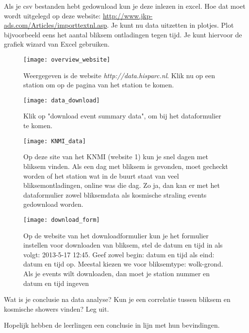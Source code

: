 \begin{questions}
\question 
Als je csv bestanden hebt gedownload kun je deze inlezen in excel. Hoe dat moet 
wordt uitgelegd op deze website: \url{ http://www.jkp-ads.com/Articles/importtextnl.asp}.
Je kunt nu data uitzetten in plotjes.
Plot bijvoorbeeld eens het aantal bliksem ontladingen tegen tijd.
Je kunt hiervoor de grafiek wizard van Excel gebruiken.


\begin{figure}
    \centering
    \texttt{[image: overview\_website]}
    \caption{Weergegeven is de website \textit{http://data.hisparc.nl}. 
    Klik nu op een station om op de pagina van 
    het station te komen.}
    \label{fig:overview_website}
\end{figure}

\begin{figure}
    \centering
    \texttt{[image: data\_download]}
    \caption{Klik op "download event summary data", om bij het dataformulier te komen.}
    \label{fig:data_download}
\end{figure}

\begin{figure}
    \centering
    \texttt{[image: KNMI\_data]}
    \caption{Op deze site van het KNMI (website 1) kun je snel dagen met bliksem vinden. Als een dag 
    met bliksem is gevonden, moet gecheckt worden of het \hisparc station wat in de
    buurt staat van veel bliksemontladingen, online was die dag. Zo ja, dan kan 
    er met het dataformulier zowel bliksemdata als kosmische straling events
    gedownload worden.}
    \label{fig:KNMI_data}
\end{figure}

\begin{figure}
    \centering
    \texttt{[image: download\_form]}
    \caption{Op de website van het downloadformulier kun je het formulier 
    instellen voor downloaden van bliksem, stel de datum en tijd in als volgt:
    2013-5-17 12:45. Geef zowel begin: datum en tijd als eind: datum en tijd op. Meestal 
    kiezen we voor bliksemtype: wolk-grond. Als je events wilt downloaden, dan 
    moet je station nummer en datum en tijd ingeven }
    \label{fig:download_form}
\end{figure}


\question 
Wat is je conclusie na data analyse? Kun je een correlatie tussen bliksem en
kosmische showers vinden? Leg uit.
\begin{solution}
  Hopelijk hebben de leerlingen een conclusie in lijn met hun bevindingen.
\end{solution}


\end{questions}

